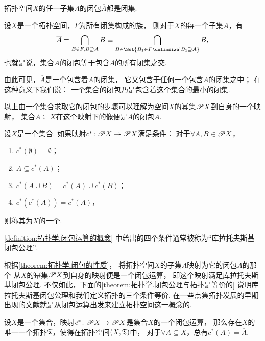 \begin{corollary}\label{theorem:拓扑学.拓扑空间子集闭包都是闭集}
拓扑空间\(X\)的任一子集\(A\)的闭包\(\overline{A}\)都是闭集.
\end{corollary}

\begin{theorem}\label{theorem:拓扑学.集合的闭包是含有该集的最小闭集}
设\(X\)是一个拓扑空间，\(F\)为所有闭集构成的族，
则对于\(X\)的每一个子集\(A\)，有\[
\overline{A}
= \bigcap\limits_{B \in F, B \supseteq A} B
\equiv \bigcap\limits_{B \in \Set{ B_1 \in F \given B_1 \supseteq A}} B,
\]
也就是说，集合\(A\)的闭包等于包含\(A\)的所有闭集之交.
\end{theorem}
由此可见，\(\overline{A}\)是一个包含着\(A\)的闭集，
它又包含于任何一个包含\(A\)的闭集之中；
在这种意义下我们说：
一个集合的闭包乃是包含着这个集合的最小的闭集.

以上由一个集合求取它的闭包的步骤可以理解为空间\(X\)的幂集\(\mathscr{P} X\)到自身的一个映射，
集合\(A \subseteq X\)在这个映射下的像便是\(A\)的闭包\(\overline{A}\).

\begin{definition}\label{definition:拓扑学.闭包运算的概念}
设\(X\)是一个集合.
如果映射\(c^*\colon \mathscr{P} X \to \mathscr{P} X\)满足条件：
对于\(\forall A,B \in \mathscr{P} X\)，\begin{enumerate}
	\item \(c^*(\emptyset) = \emptyset\)；
	\item \(A \subseteq c^*(A)\)；
	\item \(c^*(A \cup B) = c^*(A) \cup c^*(B)\)；
	\item \(c^*(c^*(A)) = c^*(A)\)，
\end{enumerate}
则称其为\(X\)的一个.
\end{definition}
\cref{definition:拓扑学.闭包运算的概念} 中给出的四个条件通常被称为“库拉托夫斯基闭包公理”.

根据\cref{theorem:拓扑学.闭包的性质}，
将拓扑空间\(X\)的子集\(A\)映射为它的闭包\(\overline{A}\)的那个
从\(X\)的幂集\(\mathscr{P} X\)到自身的映射便是一个闭包运算，
即这个映射满足库拉托夫斯基闭包公理.
不仅如此，下面的\cref{theorem:拓扑学.闭包公理与拓扑是等价的}
说明库拉托夫斯基闭包公理和我们定义拓扑的三个条件等价.
在一些点集拓扑发展的早期出现的文献就是从闭包运算出发来建立拓扑空间这一概念的.

\begin{theorem}\label{theorem:拓扑学.闭包公理与拓扑是等价的}
设\(X\)是一个集合，映射\(c^*\colon \mathscr{P} X \to \mathscr{P} X\)是集合\(X\)的一个闭包运算，
那么存在\(X\)的唯一一个拓扑\(\mathfrak T\)，使得在拓扑空间\((X,\mathfrak T)\)中，
对于\(\forall A \subseteq X\)，总有\(c^*(A) = \overline{A}\).
\end{theorem}


